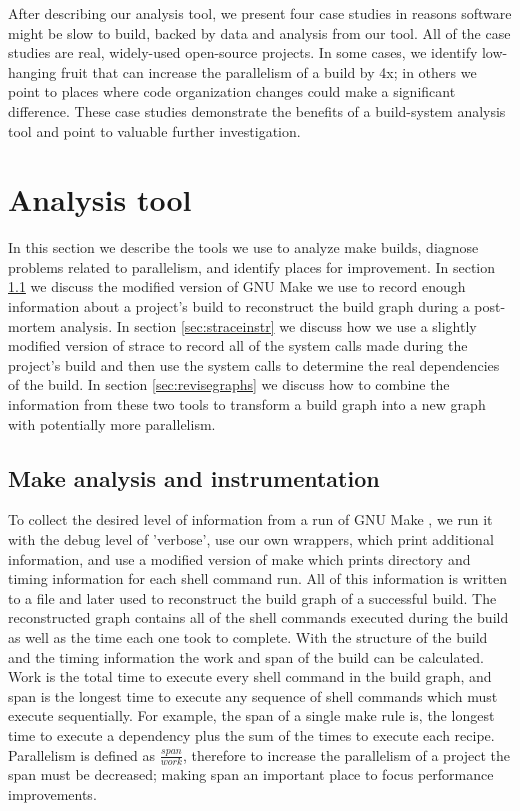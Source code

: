 \documentclass[sigconf,10pt,authorversion]{acmart}\settopmatter{printfolios=true,printccs=false,printacmref=false}
\begin{document}
After describing our analysis tool, we present four case studies in
reasons software might be slow to build, backed by data and analysis
from our tool. All of the case studies are real, widely-used
open-source projects. In some cases, we identify low-hanging fruit
that can increase the parallelism of a build by 4x; in others we point
to places where code organization changes could make a significant
difference. These case studies demonstrate the benefits of a
build-system analysis tool and point to valuable further investigation.



\section{Analysis tool}
\label{sec:analysis}
In this section we describe the tools we use to analyze make builds, diagnose problems related
to parallelism, and identify places for improvement. In section \ref{sec:makeanalysis} we
discuss the modified version of GNU Make \cite{gnumakemanual} we use to record enough information about a
project's build to reconstruct the build graph during a post-mortem analysis.
In section \ref{sec:straceinstr} we discuss how we use a slightly modified version of strace to
record all of the system calls made during the project's build and then use the system calls
to determine the real dependencies of the build. In section \ref{sec:revisegraphs} we discuss
how to combine the information from these two tools to transform a build graph into
a new graph with potentially more parallelism.

\subsection{Make analysis and instrumentation}
\label{sec:makeanalysis}

To collect the desired level of information from a run of GNU Make \cite{gnumakemanual}, we run it with the
debug level of 'verbose', use our own wrappers, which print additional information, and use
a modified version of make which prints directory and timing information for each shell command run.
All of this information is written to a file and later used to reconstruct
the build graph of a successful build.  The reconstructed graph contains all of the shell commands
executed during the build as well as the time each one took to complete.  With the structure of the
build and the timing information the work and span of the build can be calculated. Work is the total
time to execute every shell command in the build graph, and span is the longest time to execute any
sequence of shell commands which must execute sequentially.  For example, the span of a single
make rule is, the longest time to execute a dependency plus the sum of the times to execute each
recipe.  Parallelism is defined as \begin{math} \frac{span}{work} \end{math}, therefore to increase
the parallelism of a project the span must be decreased; making span an important place to focus
performance improvements.
\end{document}
